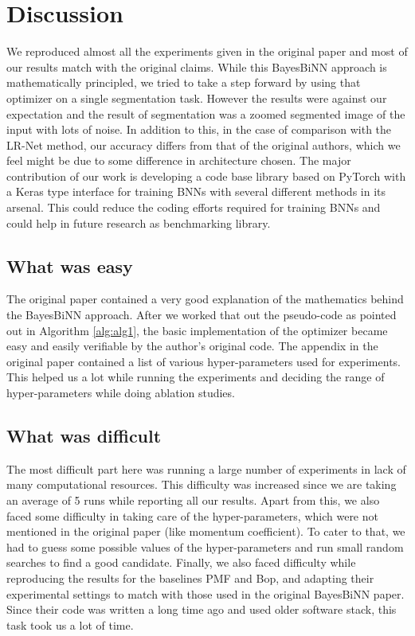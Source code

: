 \section{Discussion}
We reproduced almost all the experiments given in the original paper and most of our results match with the original claims. While this BayesBiNN approach is mathematically principled, we tried to take a step forward by using that optimizer on a single segmentation task. However the results were against our expectation and the result of segmentation was a zoomed segmented image of the input with lots of noise. In addition to this, in the case of comparison with the LR-Net method, our accuracy differs from that of the original authors, which we feel might be due to some difference in architecture chosen. The major contribution of our work is developing a code base library based on PyTorch with a Keras type interface for training BNNs with several different methods in its arsenal. This could reduce the coding efforts required for training BNNs and could help in future research as benchmarking library.

\subsection{What was easy}
The original paper contained a very good explanation of the mathematics behind the BayesBiNN approach. After we worked that out the pseudo-code as pointed out in Algorithm \autoref{alg:alg1}, the basic implementation of the optimizer became easy and easily verifiable by the author's original code. The appendix in the original paper contained a list of various hyper-parameters used for experiments. This helped us a lot while running the experiments and deciding the range of hyper-parameters while doing ablation studies.

\subsection{What was difficult}
The most difficult part here was running a large number of experiments in lack of many computational resources. This difficulty was increased since we are taking an average of 5 runs while reporting all our results. Apart from this, we also faced some difficulty in taking care of the hyper-parameters, which were not mentioned in the original paper (like momentum coefficient). To cater to that, we had to guess some possible values of the hyper-parameters and run small random searches to find a good candidate. Finally, we also faced difficulty while reproducing the results for the baselines PMF and Bop, and adapting their experimental settings to match with those used in the original BayesBiNN paper. Since their code was written a long time ago and used older software stack, this task took us a lot of time.

